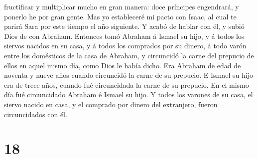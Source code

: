 fructificar y multiplicar mucho en gran manera: doce príncipes
engendrará, y ponerlo he por gran gente.  Mas yo
estableceré mi pacto con Isaac, al cual te parirá Sara por este tiempo
el año siguiente.  Y acabó de hablar con él, y subió Dios
de con Abraham.  Entonces tomó Abraham á Ismael su hijo, y
á todos los siervos nacidos en su casa, y á todos los comprados por su
dinero, á todo varón entre los domésticos de la casa de Abraham, y
circuncidó la carne del prepucio de ellos en aquel mismo día, como Dios
le había dicho.  Era Abraham de edad de noventa y nueve
años cuando circuncidó la carne de su prepucio.  E Ismael
su hijo era de trece años, cuando fué circuncidada la carne de su
prepucio.  En el mismo día fué circuncidado Abraham é
Ismael su hijo.  Y todos los varones de su casa, el siervo
nacido en casa, y el comprado por dinero del extranjero, fueron
circuncidados con él.

\hypertarget{section-17}{%
\section{18}\label{section-17}}

